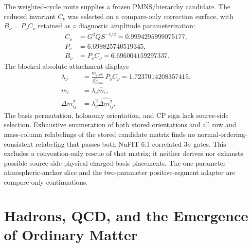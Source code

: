 \documentclass[11pt]{article}
\begin{document}
The weighted-cycle route supplies a frozen PMNS/hierarchy candidate. The reduced invariant
\(C_\nu\) was selected on a compare-only correction surface, with
\(B_\nu=P_\nu C_\nu\) retained as a diagnostic amplitude parameterization:
\[
\begin{aligned}
C_\nu&=G^2Q S^{-1/2}=0.9994295999075177,\\
P_\nu&=6.699825740519345,\\
B_\nu&=P_\nu C_\nu=6.696004159297337.
\end{aligned}
\]
The blocked absolute attachment displays
\[
\begin{aligned}
\lambda_\nu&=\frac{m_{\star,\mathrm{eV}}}{q_{\mathrm{mean}}^{p_\nu}}\,P_\nu C_\nu=1.7237014208357415,\\
m_i&=\lambda_\nu \hat m_i,\\
\Delta m_{ij}^2&=\lambda_\nu^2\widehat{\Delta m_{ij}^2}.
\end{aligned}
\]
The basis permutation, holonomy orientation, and CP sign lack source-side selection. Exhaustive
enumeration of both stored orientations and all row and mass-column relabelings of the stored
candidate matrix finds no normal-ordering-consistent relabeling that passes both NuFIT 6.1
correlated \(3\sigma\) gates. This excludes a convention-only rescue of that matrix; it neither
derives nor exhausts possible source-side physical charged-basis placements.
The one-parameter atmospheric-anchor slice and the two-parameter positive-segment adapter are
compare-only continuations.

\section{Hadrons, QCD, and the Emergence of Ordinary Matter}
\end{document}
